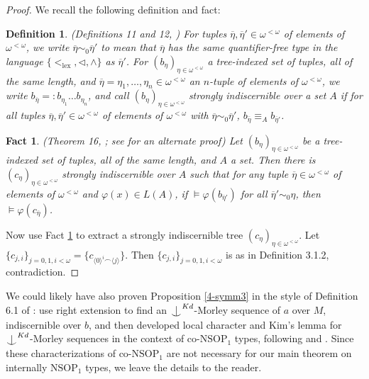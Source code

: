 \documentclass[12pt]{amsart}
\newtheorem{fact}[theorem]{Fact}
\newtheorem{definition}{Definition}[section]
\theoremstyle{definition}
\def\Ind#1#2{#1\setbox0=\hbox{$#1x$}\kern\wd0\hbox to 0pt{\hss$#1\mid$\hss}
\lower.9\ht0\hbox to 0pt{\hss$#1\smile$\hss}\kern\wd0}
\def\ind{\mathop{\mathpalette\Ind{}}}
\begin{document}
\begin{proof}
We recall the following definition and fact:

\begin{definition}
   (Definitions 11 and 12, \cite{TT12}) For tuples $\overline{\eta}, \overline{\eta}' \in \omega^{<\omega}$ of elements of $\omega^{<\omega}$, we write $\overline{\eta} \sim_{0} \overline{\eta}'$ to mean that $\overline{\eta}$ has the same quantifier-free type in the language $\{<_{\mathrm{lex}}, \lhd, \wedge \}$ as $\overline{\eta}'$. For $(b_{\eta})_{\eta \in \omega^{<\omega}}$ a tree-indexed set of tuples, all of the same length, and $\overline{\eta} = \eta_{1}, \ldots, \eta_{n} \in \omega^{<\omega}$ an $n$-tuple of elements of $\omega^{<\omega}$, we write $b_{\overline{\eta}}=: b_{\eta_{1}}\ldots b_{\eta_{n}}$, and call $(b_{\eta})_{\eta \in \omega^{<\omega}}$ \emph{strongly indiscernible} over a set $A$ if for all tuples  $\overline{\eta}, \overline{\eta}' \in \omega^{<\omega}$ of elements of $\omega^{<\omega}$ with $\overline{\eta} \sim_{0} \overline{\eta}'$, $b_{\overline{\eta}} \equiv_{A} b_{\overline{\eta}'}$.
\end{definition}

\begin{fact} \label{4-indisc3} (Theorem 16, \cite{TT12}; see \cite{Sc15} for an alternate proof) Let $(b_{\eta})_{\eta \in \omega^{<\omega}}$ be a tree-indexed set of tuples, all of the same length, and $A$ a set. Then there is $(c_{\eta})_{\eta \in \omega^{<\omega}}$ strongly indiscernible over $A$ such that for any tuple $\overline{\eta} \in \omega^{< \omega}$ of elements of $\omega^{<\omega}$ and $\varphi(x) \in L(A)$, if $\models \varphi(b_{\overline{\eta}'})$ for all $\overline{\eta}' \sim_{0} \eta$, then $\models \varphi(c_{\overline{\eta}})$.
\end{fact}

Now use Fact \ref{4-indisc3} to extract a strongly indiscernible tree $(c_{\eta})_{\eta \in \omega^{<\omega}}$. Let $\{c_{j, i}\}_{j = 0, 1, i < \omega} =\{c_{\langle 0\rangle^{i} \smallfrown \langle j \rangle}\}$. Then $\{c_{j, i}\}_{j = 0, 1, i < \omega}$ is as in Definition 3.1.2, contradiction. 





\end{proof}

We could likely have also proven Proposition \ref{4-symm3} in the style of Definition 6.1 of \cite{Che14}: use right extension to find an $\ind^{Kd}$-Morley sequence of $a$ over $M$, indiscernible over $b$, and then developed local character and Kim's lemma for $\ind^{Kd}$-Morley sequences in the context of co-$\mathrm{NSOP}_{1}$ types, following \cite{KRS19} and \cite{KR19}. Since these characterizations of co-$\mathrm{NSOP}_{1}$ are not necessary for our main theorem on internally $\mathrm{NSOP}_{1}$ types, we leave the details to the reader.
\end{document}
